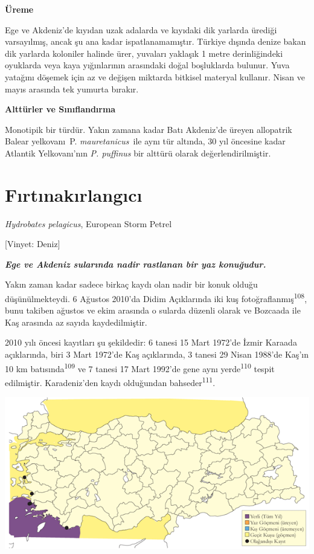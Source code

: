 \documentclass[
  letterpaper,
  DIV=11,
  numbers=noendperiod]{scrreprt}
\begin{document}
\textbf{Üreme}

Ege ve Akdeniz'de kıyıdan uzak adalarda ve kıyıdaki dik yarlarda ürediği
varsayılmış, ancak şu ana kadar ispatlanamamıştır. Türkiye dışında
denize bakan dik yarlarda koloniler halinde ürer, yuvaları yaklaşık 1
metre derinliğindeki oyuklarda veya kaya yığınlarının arasındaki doğal
boşluklarda bulunur. Yuva yatağını döşemek için az ve değişen miktarda
bitkisel materyal kullanır. Nisan ve mayıs arasında tek yumurta bırakır.

\textbf{Alttürler ve Sınıflandırma}

Monotipik bir türdür. Yakın zamana kadar Batı Akdeniz'de üreyen
allopatrik Balear yelkovanı~P. \emph{mauretanicus}~ile aynı tür altında,
30 yıl öncesine kadar Atlantik Yelkovanı'nın \emph{P. puffinus} bir
alttürü olarak değerlendirilmiştir.

\section{Fırtınakırlangıcı}\label{fux131rtux131nakux131rlangux131cux131}

\emph{Hydrobates pelagicus}, European Storm Petrel

{[}Vinyet: Deniz{]}

\textbf{\emph{Ege ve Akdeniz sularında nadir rastlanan bir yaz
konuğudur.}}

Yakın zaman kadar sadece birkaç kaydı olan nadir bir konuk olduğu
düşünülmekteydi. 6 Ağustos 2010'da Didim Açıklarında iki kuş
fotoğraflanmış\textsuperscript{108}, bunu takiben ağustos ve ekim
arasında o sularda düzenli olarak ve Bozcaada ile Kaş arasında az sayıda
kaydedilmiştir.

2010 yılı öncesi kayıtları şu şekildedir: 6 tanesi 15 Mart 1972'de İzmir
Karaada açıklarında, biri 3 Mart 1972'de Kaş açıklarında, 3 tanesi 29
Nisan 1988'de Kaş'ın 10 km batısında\textsuperscript{109} ve 7 tanesi 17
Mart 1992'de gene aynı yerde\textsuperscript{110} tespit edilmiştir.
Karadeniz'den kaydı olduğundan bahseder\textsuperscript{111}.

\includegraphics{images/harita_Page_050.png}
\end{document}
